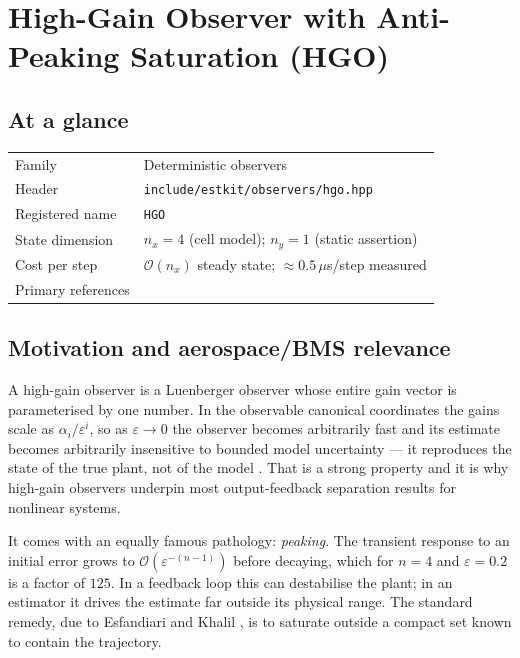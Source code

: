 \chapter{High-Gain Observer with Anti-Peaking Saturation (HGO)}
\label{ch:hgo}

\section*{At a glance}
\begin{tabular}{@{}l>{\raggedright\arraybackslash}p{}@{}}
Family & Deterministic observers \\
Header & \texttt{include/estkit/observers/hgo.hpp} \\
Registered name & \texttt{HGO} \\
State dimension & $n_x = 4$ (cell model); $n_y = 1$ (static assertion) \\
Cost per step & $\mathcal{O}(n_x)$ steady state; $\approx 0.5\,\mu$s/step measured \\
Primary references & \cite{khalil2002,khalilpraly2014hgo,esfandiari1992saturation,khalil2017hgo} \\
\end{tabular}

\section{Motivation and aerospace/BMS relevance}
A high-gain observer is a Luenberger observer whose entire gain vector is parameterised by one
number.  In the observable canonical coordinates the gains scale as $\alpha_i/\varepsilon^i$, so
as $\varepsilon\to0$ the observer becomes arbitrarily fast and its estimate becomes arbitrarily
insensitive to bounded model uncertainty --- it reproduces the state of the true plant, not of
the model \cite{khalil2002,khalilpraly2014hgo}.  That is a strong property and it is why
high-gain observers underpin most output-feedback separation results for nonlinear systems.

It comes with an equally famous pathology: \emph{peaking}.  The transient response to an initial
error grows to $\mathcal{O}(\varepsilon^{-(n-1)})$ before decaying, which for $n=4$ and
$\varepsilon = 0.2$ is a factor of $125$.  In a feedback loop this can destabilise the plant; in
an estimator it drives the estimate far outside its physical range.  The standard remedy, due to
Esfandiari and Khalil \cite{esfandiari1992saturation}, is to saturate outside a compact set known
to contain the trajectory.

